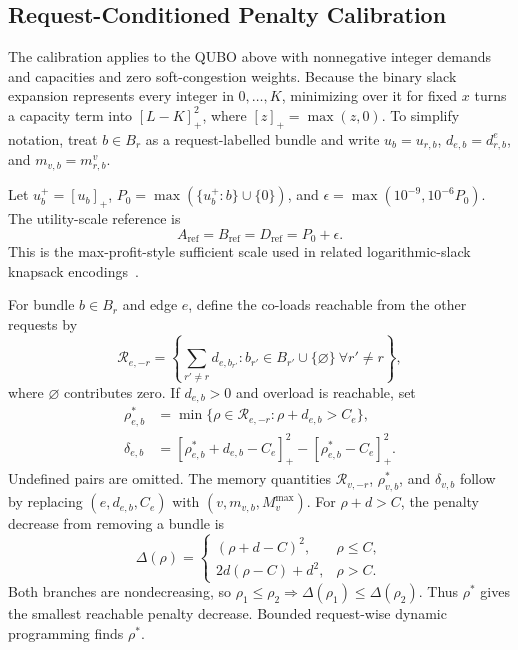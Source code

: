 \documentclass[twocolumn]{article}
\begin{document}
\subsection{Request-Conditioned Penalty Calibration}
\label{sec:penalty-calibration}

The calibration applies to the QUBO above with nonnegative integer
demands and capacities and zero soft-congestion weights.  Because the binary
slack expansion represents every integer in $0,\ldots,K$, minimizing over it for 
fixed $x$ turns a capacity term into $[L-K]_+^2$, where $[z]_+=\max(z,0)$.  
To simplify notation, treat $b\in B_r$ as a request-labelled bundle and 
write $u_b=u_{r,b}$, $d_{e,b}=d_{r,b}^e$, and $m_{v,b}=m_{r,b}^v$.

Let $u_b^+=[u_b]_+$,
$P_0=\max(\{u_b^+:b\}\cup\{0\})$, and
$\epsilon=\max(10^{-9},10^{-6}P_0)$.  The utility-scale reference is
\begin{equation}
  A_{\mathrm{ref}}=B_{\mathrm{ref}}=D_{\mathrm{ref}}
  =P_0+\epsilon.
  \label{eq:reference-calibration}
\end{equation}
This is the max-profit-style sufficient scale used in related
logarithmic-slack knapsack encodings~\cite{quintero2021knapsack,
guney2025multiknapsack}.

For bundle $b\in B_r$ and edge $e$, define the co-loads reachable from
the other requests by
\begin{equation}
  \mathcal R_{e,-r}=
  \left\{\sum_{r'\ne r}d_{e,b_{r'}}:
    b_{r'}\in B_{r'}\cup\{\varnothing\}\ \forall r'\ne r\right\},
  \label{eq:reachable-loads}
\end{equation}
where $\varnothing$ contributes zero.  If $d_{e,b}>0$ and overload is
reachable, set
\begin{align}
  \rho^*_{e,b}
    &=\min\{\rho\in\mathcal R_{e,-r}:\rho+d_{e,b}>C_e\},\\
  \delta_{e,b}
    &=[\rho^*_{e,b}+d_{e,b}-C_e]_+^2
      -[\rho^*_{e,b}-C_e]_+^2.
  \label{eq:edge-penalty-drop}
\end{align}
Undefined pairs are omitted.  The memory quantities
$\mathcal R_{v,-r}$, $\rho^*_{v,b}$, and $\delta_{v,b}$ follow by
replacing $(e,d_{e,b},C_e)$ with $(v,m_{v,b},M_v^{\max})$.
For $\rho+d>C$, the penalty decrease from removing a bundle is
\begin{equation}
  \Delta(\rho)=
  \begin{cases}
    (\rho+d-C)^2, & \rho\le C,\\
    2d(\rho-C)+d^2, & \rho>C.
  \end{cases}
  \label{eq:drop-monotonicity}
\end{equation}
Both branches are nondecreasing, so
$\rho_1\le\rho_2\Rightarrow\Delta(\rho_1)\le\Delta(\rho_2)$.
Thus $\rho^*$ gives the smallest reachable penalty decrease.  Bounded
request-wise dynamic programming finds $\rho^*$.
\end{document}
